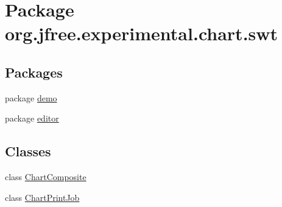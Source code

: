 \hypertarget{namespaceorg_1_1jfree_1_1experimental_1_1chart_1_1swt}{}\section{Package org.\+jfree.\+experimental.\+chart.\+swt}
\label{namespaceorg_1_1jfree_1_1experimental_1_1chart_1_1swt}
\subsection*{Packages}
\begin{DoxyCompactItemize}
\item 
package \mbox{\hyperlink{namespaceorg_1_1jfree_1_1experimental_1_1chart_1_1swt_1_1demo}{demo}}
\item 
package \mbox{\hyperlink{namespaceorg_1_1jfree_1_1experimental_1_1chart_1_1swt_1_1editor}{editor}}
\end{DoxyCompactItemize}
\subsection*{Classes}
\begin{DoxyCompactItemize}
\item 
class \mbox{\hyperlink{classorg_1_1jfree_1_1experimental_1_1chart_1_1swt_1_1_chart_composite}{Chart\+Composite}}
\item 
class \mbox{\hyperlink{classorg_1_1jfree_1_1experimental_1_1chart_1_1swt_1_1_chart_print_job}{Chart\+Print\+Job}}
\end{DoxyCompactItemize}
